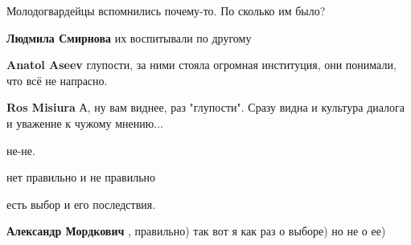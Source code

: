 \begin{itemize}
Молодогвардейцы вспомнились почему-то. По сколько им было?

\begin{itemize}
 
\textbf{Людмила Смирнова} их воспитывали по другому

 
\textbf{Anatol Aseev} глупости, за ними стояла огромная институция, они понимали, что всё не напрасно.

 
\textbf{Ros Misiura} А, ну вам виднее, раз "глупости". Сразу видна и культура диалога и уважение к чужому мнению...
\end{itemize}

 

не-не.

нет правильно и не правильно

есть выбор и его последствия.

\begin{itemize}
 
\textbf{Александр Мордкович} , правильно) так вот я как раз о выборе) но не о ее)

 

\end{itemize}
\end{itemize}
